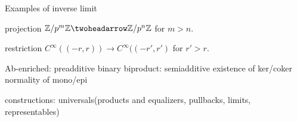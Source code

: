 \documentclass{../../small}
\begin{document}
\begin{ex}
Examples of inverse limit
\begin{parts}
\item projection $\Z/p^m\Z\twoheadarrow\Z/p^n\Z$ for $m>n$.
\item restriction $C^\infty((-r,r))\to C^\infty((-r',r')$ for $r'>r$.
\end{parts}
\end{ex}


Ab-enriched: preadditive
binary biproduct: semiadditive
existence of ker/coker
normality of mono/epi

constructions: universals(products and equalizers, pullbacks, limits, representables)
\end{document}
